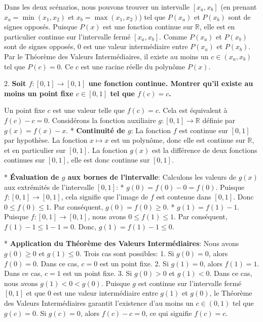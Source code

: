\documentclass[12pt,a4paper]{report}
\begin{document}
    Dans les deux scénarios, nous pouvons trouver un intervalle $[x_a, x_b]$ (en prenant $x_a = \min(x_1, x_2)$ et $x_b = \max(x_1, x_2)$) tel que $P(x_a)$ et $P(x_b)$ sont de signes opposés.
    Puisque $P(x)$ est une fonction continue sur $\mathbb{R}$, elle est en particulier continue sur l'intervalle fermé $[x_a, x_b]$.
    Comme $P(x_a)$ et $P(x_b)$ sont de signes opposés, $0$ est une valeur intermédiaire entre $P(x_a)$ et $P(x_b)$.
    Par le Théorème des Valeurs Intermédiaires, il existe au moins un $c \in (x_a, x_b)$ tel que $P(c) = 0$.
    Ce $c$ est une racine réelle du polynôme $P(x)$.

2.  \textbf{Soit $f: [0, 1] \to [0, 1]$ une fonction continue. Montrer qu'il existe au moins un point fixe $c \in [0, 1]$ tel que $f(c) = c$.}

    Un point fixe $c$ est une valeur telle que $f(c) = c$. Cela est équivalent à $f(c) - c = 0$.
    Considérons la fonction auxiliaire $g: [0, 1] \to \mathbb{R}$ définie par $g(x) = f(x) - x$.
    *   \textbf{Continuité de $g$}:
        La fonction $f$ est continue sur $[0, 1]$ par hypothèse.
        La fonction $x \mapsto x$ est un polynôme, donc elle est continue sur $\mathbb{R}$, et en particulier sur $[0, 1]$.
        La fonction $g(x)$ est la différence de deux fonctions continues sur $[0, 1]$, elle est donc continue sur $[0, 1]$.

    *   \textbf{Évaluation de $g$ aux bornes de l'intervalle}:
        Calculons les valeurs de $g(x)$ aux extrémités de l'intervalle $[0, 1]$:
        *   $g(0) = f(0) - 0 = f(0)$.
            Puisque $f: [0, 1] \to [0, 1]$, cela signifie que l'image de $f$ est contenue dans $[0, 1]$. Donc $0 \le f(0) \le 1$.
            Par conséquent, $g(0) = f(0) \ge 0$.
        *   $g(1) = f(1) - 1$.
            Puisque $f: [0, 1] \to [0, 1]$, nous avons $0 \le f(1) \le 1$.
            Par conséquent, $f(1) - 1 \le 1 - 1 = 0$.
            Donc, $g(1) = f(1) - 1 \le 0$.

    *   \textbf{Application du Théorème des Valeurs Intermédiaires}:
        Nous avons $g(0) \ge 0$ et $g(1) \le 0$.
        Trois cas sont possibles:
        1.  Si $g(0) = 0$, alors $f(0) = 0$. Dans ce cas, $c=0$ est un point fixe.
        2.  Si $g(1) = 0$, alors $f(1) = 1$. Dans ce cas, $c=1$ est un point fixe.
        3.  Si $g(0) > 0$ et $g(1) < 0$. Dans ce cas, nous avons $g(1) < 0 < g(0)$.
            Puisque $g$ est continue sur l'intervalle fermé $[0, 1]$ et que $0$ est une valeur intermédiaire entre $g(1)$ et $g(0)$, le Théorème des Valeurs Intermédiaires garantit l'existence d'au moins un $c \in (0, 1)$ tel que $g(c) = 0$.
            Si $g(c) = 0$, alors $f(c) - c = 0$, ce qui signifie $f(c) = c$.
\end{document}
